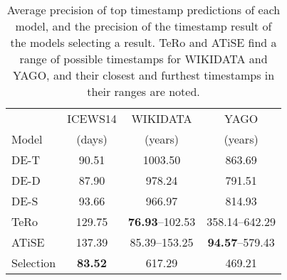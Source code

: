 \begin{table}[htb]
\centering
\begin{minipage}{\columnwidthcaption}
\centering
\caption{Average precision of top timestamp predictions of each model, and the precision of the timestamp result of the models selecting a result. TeRo and ATiSE find a range of possible timestamps for WIKIDATA and YAGO, and their closest and furthest timestamps in their ranges are noted.}
\vspace{-3mm}

\begin{tabular}{l|ccc}\hline
 & ICEWS14 & WIKIDATA & YAGO \\
Model & (days) & (years) & (years) \\ \hline
DE-T & 90.51 & 1003.50 & 863.69 \\ 
DE-D & 87.90 & 978.24 & 791.51 \\ 
DE-S & 93.66 & 966.97 & 814.93 \\ 
TeRo & 129.75 & \textbf{76.93}–102.53 & 358.14–642.29 \\
ATiSE & 137.39 & 85.39–153.25 & \textbf{94.57}–579.43 \\ \hline
Selection & \textbf{83.52} & 617.29 & 469.21 \\ \hline 

\end{tabular}

\label{tab:timestamp_voting_table}
\end{minipage}
\end{table}

